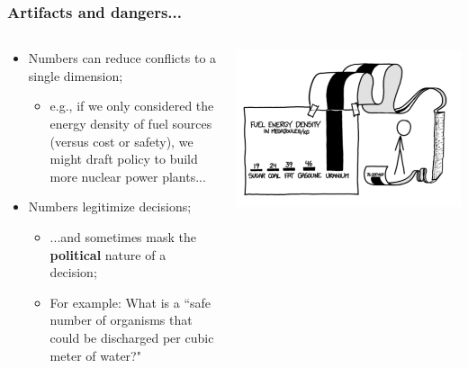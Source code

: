 \documentclass[aspectratio=169]{beamer}
\theoremstyle{principle}
\begin{document}
\begin{frame}
\frametitle{Artifacts and dangers...}
\begin{columns}
\begin{column}{0.5\textwidth}

\begin{itemize}
\item Numbers can reduce conflicts to a single dimension;
\begin{itemize}
\item e.g., if we only considered the energy density of fuel sources (versus cost or safety), we might draft policy to build more nuclear power plants...
\end{itemize} 
\bigskip

\item Numbers legitimize decisions;
\begin{itemize}
\item ...and sometimes mask the \textbf{political} nature of a decision;
\item For example: What is a ``safe number of organisms that could be discharged per cubic meter of water?"
\end{itemize}
\end{itemize}

\end{column}
\begin{column}{0.5\textwidth}
\includegraphics[scale=0.4]{energy.png}
\end{column}
\end{columns}

\end{frame}
\end{document}
